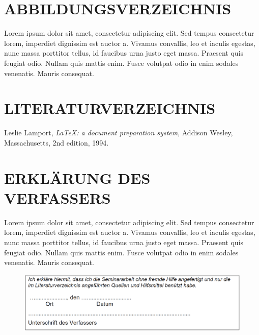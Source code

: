 \documentclass[a4paper,12pt]{article}
\begin{document}

\newpage
\section{ABBILDUNGSVERZEICHNIS}



Lorem ipsum dolor sit amet, consectetur adipiscing elit. Sed tempus consectetur lorem, imperdiet dignissim est auctor a. Vivamus convallis, leo et iaculis egestas, nunc massa porttitor tellus, id faucibus urna justo eget massa. Praesent quis feugiat odio. Nullam quis mattis enim. Fusce volutpat odio in enim sodales venenatis. Mauris consequat.


\newpage
\section{LITERATURVERZEICHNIS}

\begin{thebibliography}{9}

      Leslie Lamport,
      \textit{\LaTeX: a document preparation system},
      Addison Wesley, Massachusetts,
      2nd edition,
      1994.
    
\end{thebibliography}


\newpage
\section{ERKLÄRUNG DES VERFASSERS}



Lorem ipsum dolor sit amet, consectetur adipiscing elit. Sed tempus consectetur lorem, imperdiet dignissim est auctor a. Vivamus convallis, leo et iaculis egestas, nunc massa porttitor tellus, id faucibus urna justo eget massa. Praesent quis feugiat odio. Nullam quis mattis enim. Fusce volutpat odio in enim sodales venenatis. Mauris consequat.

\begin{figure}[H]
    \includegraphics[width=\linewidth]{Bilder/Sonstiges/ErklaerungDesVerfassers.png}
\end{figure}
\end{document}
